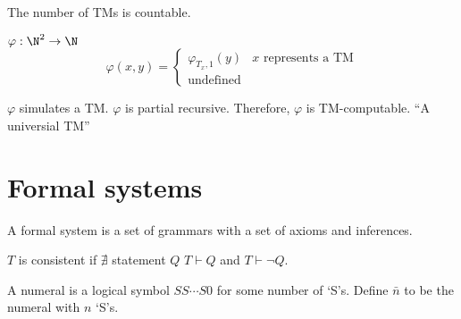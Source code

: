 \documentclass{article}
\begin{document}
\begin{theorem}
    The number of TMs is countable.
\end{theorem}
\begin{theorem}
    \(\varphi:\N^2\to\N\)
    \[
        \varphi(x, y) = \begin{cases}
            \varphi_{T_x, 1}(y) & x \text{ represents a TM} \\
            \text{undefined}
        \end{cases}
    \]
    
    \(\varphi\) simulates a TM.
    \(\varphi\) is partial recursive.
    Therefore, \(\varphi\) is TM-computable. ``A universial TM''
\end{theorem}
\newpage
\section{Formal systems}
\begin{definition}
    A formal system is a set of grammars with a set of axioms and inferences.
\end{definition}
\begin{definition}

\end{definition}
\begin{definition}

\end{definition}
\begin{definition}[Consistency]
    \(T\) is consistent if \(\nexists\) statement \(Q\)
    \st \(T\vdash Q\) and \(T\vdash\lnot Q\).
\end{definition}
\begin{definition}[Numeral]
    A numeral is a logical symbol \(SS\cdots S 0\)
    for some number of `S's.
    Define \(\bar{n}\) to be the numeral with \(n\) `S's.
\end{definition}
\end{document}
